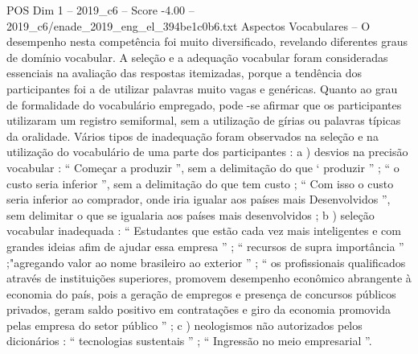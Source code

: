 \begin{textsample}{POS Dim 1 – 2019\_c6 – Score -4.00 – 2019\_c6/enade\_2019\_eng\_el\_394be1c0b6.txt}
Aspectos Vocabulares – O desempenho nesta competência foi muito diversificado, revelando diferentes graus de domínio vocabular.
A seleção e a adequação vocabular foram consideradas essenciais na avaliação das respostas itemizadas, porque a tendência dos participantes foi a de utilizar palavras muito vagas e genéricas.
Quanto ao grau de formalidade do vocabulário empregado, pode -se afirmar que os participantes utilizaram um registro semiformal, sem a utilização de gírias ou palavras típicas da oralidade.
Vários tipos de inadequação foram observados na seleção e na utilização do vocabulário de uma parte dos participantes : a ) desvios na precisão vocabular : “ Começar a produzir ”, sem a delimitação do que ‘ produzir ” ; “ o custo seria inferior ”, sem a delimitação do que tem custo ; “ Com isso o custo seria inferior ao comprador, onde iria igualar aos países mais Desenvolvidos ”, sem delimitar o que se igualaria aos países mais desenvolvidos ; b ) seleção vocabular inadequada : “ Estudantes que estão cada vez mais inteligentes e com grandes ideias afim de ajudar essa empresa ” ; “ recursos de supra importância ” ;"agregando valor ao nome brasileiro ao exterior ” ; “ os profissionais qualificados através de instituições superiores, promovem desempenho econômico abrangente à economia do país, pois a geração de empregos e presença de concursos públicos privados, geram saldo positivo em contratações e giro da economia promovida pelas empresa do setor público ” ; c ) neologismos não autorizados pelos dicionários : “ tecnologias sustentais ” ; “ Ingressão no meio empresarial ”.

\end{textsample}
